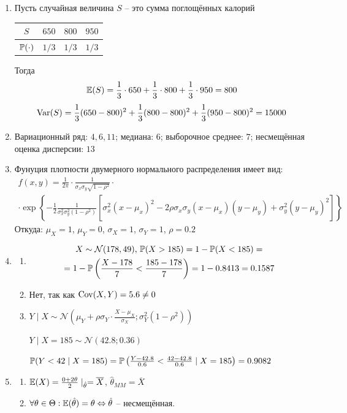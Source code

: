 \documentclass[12pt, a4paper]{article}\usepackage[]{graphicx}\usepackage[]{color}
\newcommand{\cN}{\mathcal{N}}
\begin{document}
\begin{enumerate}
\item Пусть случайная величина $S$ – это сумма поглощённых калорий

\begin{tabular}{cccc}
\toprule
$S$ & $650$ & $800$ & $950$ \\ \midrule
$\P(\cdot)$ & $1/3$ & $1/3$ & $1/3$ \\ \bottomrule
\end{tabular}

Тогда
\[
\E(S) = \frac{1}{3}\cdot 650 +  \frac{1}{3}\cdot 800 +  \frac{1}{3}\cdot 950 = 800
\]
\[
\Var(S) = \frac{1}{3}(650-800)^2 + \frac{1}{3}(800-800)^2 + \frac{1}{3}(950-800)^2 = 15000
\]
\item Вариационный ряд: $4, 6, 11$; медиана: $6$; выборочное среднее: $7$; несмещённая оценка дисперсии: $13$
\item Фунуция плотности двумерного нормального распределения имеет вид:
\begin{multline*}
f(x,y) =  \frac{1}{2\pi}\cdot \frac{1}{\sigma_x \sigma_y \sqrt{1-\rho^2}} \cdot \\
\cdot \exp\left\{{-\frac{1}{2}\frac{1}{\sigma_x^2 \sigma_y^2(1-\rho^2)}\left[\sigma_x^2(x-\mu_x)^2-2\rho\sigma_x\sigma_y(x-\mu_x)(y-\mu_y)+\sigma_y^2(y-\mu_y)^2\right]}\right\}
\end{multline*}
Откуда: $\mu_X=1$, $\mu_Y=0$, $\sigma_X = 1$, $\sigma_Y = 1$, $\rho = 0.2$

\item
\begin{enumerate}
\item \begin{multline*}
X \sim \cN(178, 49)$, $\P(X>185) = 1  - \P(X<185) = \\
= 1- \P\left(\frac{X-178}{7} < \frac{185-178}{7}\right) = 1 - 0.8413 = 0.1587
\end{multline*}
\item Нет, так как $\Cov(X, Y) = 5.6 \neq 0$
\item $Y \mid X \sim \cN\left(\mu_Y + \rho\sigma_Y\cdot\frac{X-\mu_X}{\sigma_X}; \sigma_Y^2(1-\rho^2)\right)$

$Y \mid X=185 \sim \cN(42.8;0.36)$

$\P(Y<42 \mid X=185) = \P\left(\frac{Y-42.8}{0.6} < \frac{42-42.8}{0.6}\mid X=185\right) = 0.9082$
\end{enumerate}

\item
\begin{enumerate}
\item $\E(X) = \frac{0+2\theta}{2}\mid_{\hat{\theta}} = \overline{X}$, $\hat{\theta}_{MM} = \overline{X}$
\item $\forall \theta \in \Theta: \E(\hat{\theta})=\theta \Leftrightarrow \hat{\theta}$ – несмещённая.


\end{enumerate}
\end{enumerate}
\end{document}
